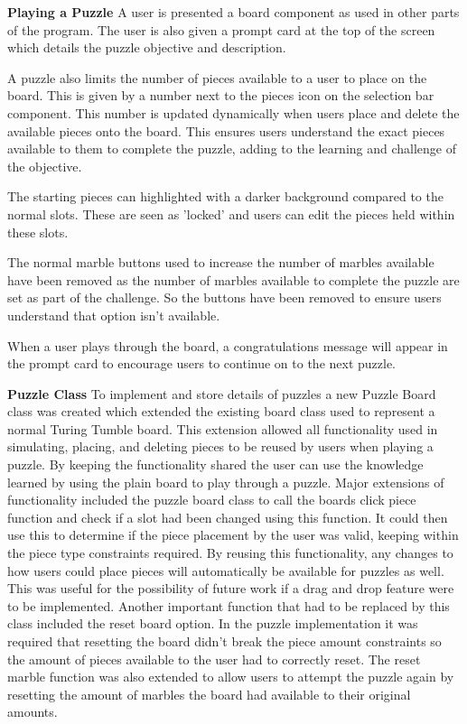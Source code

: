 \documentclass{l4proj}
\begin{document}
\textbf{Playing a Puzzle}
A user is presented a board component as used in other parts of the program. The user is also given a prompt card at the top of the screen which details the puzzle objective and description.

A puzzle also limits the number of pieces available to a user to place on the board. This is given by a number next to the pieces icon on the selection bar component. This number is updated dynamically when users place and delete the available pieces onto the board. This ensures users understand the exact pieces available to them to complete the puzzle, adding to the learning and challenge of the objective. 

The starting pieces can highlighted with a darker background compared to the normal slots. These are seen as 'locked' and users can edit the pieces held within these slots. 

The normal marble buttons used to increase the number of marbles available have been removed as the number of marbles available to complete the puzzle are set as part of the challenge. So the buttons have been removed to ensure users understand that option isn't available. 

When a user plays through the board, a congratulations message will appear in the prompt card to encourage users to continue on to the next puzzle.

\textbf{Puzzle Class}
To implement and store details of puzzles a new Puzzle Board class was created which extended the existing board class used to represent a normal Turing Tumble board. This extension allowed all functionality used in simulating, placing, and deleting pieces to be reused by users when playing a puzzle. By keeping the functionality shared the user can use the knowledge learned by using the plain board to play through a puzzle. Major extensions of functionality included the puzzle board class to call the boards click piece function and check if a slot had been changed using this function. It could then use this to determine if the piece placement by the user was valid, keeping within the piece type constraints required. By reusing this functionality, any changes to how users could place pieces will automatically be available for puzzles as well. This was useful for the possibility of future work if a drag and drop feature were to be implemented. Another important function that had to be replaced by this class included the reset board option. In the puzzle implementation it was required that resetting the board didn't break the piece amount constraints so the amount of pieces available to the user had to correctly reset. The reset marble function was also extended to allow users to attempt the puzzle again by resetting the amount of marbles the board had available to their original amounts. 
\end{document}

